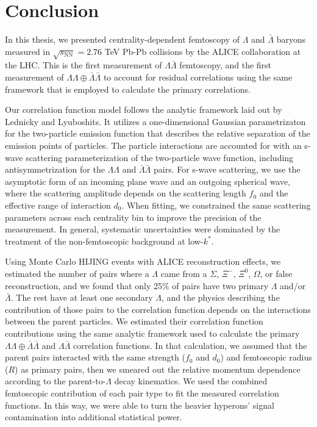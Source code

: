 \chapter{Conclusion}
\label{sec:Conclusion}

In this thesis, we presented centrality-dependent femtoscopy of $\Lambda$ and $\bar{\Lambda}$ baryons measured in $\sqrt{s_\mathrm{NN}} = 2.76$ TeV Pb-Pb collisions by the ALICE collaboration at the LHC.
This is the first measurement of $\Lambda\bar{\Lambda}$ femtoscopy, and the first measurement of $\Lambda\Lambda\oplus\bar{\Lambda}\bar{\Lambda}$ to account for residual correlations using the same framework that is employed to calculate the primary correlations.

Our correlation function model follows the analytic framework laid out by Lednicky and Lyuboshits.
It utilizes a one-dimensional Gaussian parametrizaton  for the two-particle emission function that describes the relative separation of the emission points of particles.
The particle interactions are accounted for with an s-wave scattering parameterization of the two-particle wave function, including antisymmetrization for the $\Lambda\Lambda$ and $\bar{\Lambda}\bar{\Lambda}$ pairs.
For s-wave scattering, we use the asymptotic form of an incoming plane wave and an outgoing spherical wave, where the scattering amplitude depends on the scattering length $f_0$ and the effective range of interaction $d_0$.
When fitting, we constrained the same scattering parameters across each centrality bin to improve the precision of the measurement.
In general, systematic uncertainties were dominated by the treatment of the non-femtoscopic background at low-$k^*$.

Using Monte Carlo HIJING events with ALICE reconstruction effects, we estimated the number of pairs where a $\Lambda$ came from a $\Sigma$, $\Xi^-$, $\Xi^0$, $\Omega$, or false reconstruction, and we found that only 25\% of pairs have two primary $\Lambda$ and/or $\bar{\Lambda}$.
The rest have at least one secondary $\Lambda$, and the physics describing the contribution of those pairs to the correlation function depends on the interactions between the parent particles.
We estimated their correlation function contributions using the same analytic framework used to calculate the primary $\Lambda\Lambda\oplus\bar{\Lambda}\bar{\Lambda}$ and $\Lambda\bar{\Lambda}$ correlation functions.
In that calculation, we assumed that the parent pairs interacted with the same strength ($f_0$ and $d_0$) and femtoscopic radius ($R$) as primary pairs, then we smeared out the relative momentum dependence according to the parent-to-$\Lambda$ decay kinematics.
We used the combined femtoscopic contribution of each  pair type to fit the measured correlation functions.
In this way, we were able to turn the heavier hyperons' signal contamination into additional statistical power.

